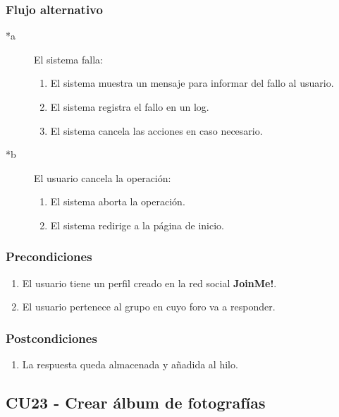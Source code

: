 \documentclass[12pt, a4paper, titlepage]{article}
\begin{document}
\subsubsection{Flujo alternativo}

\begin{description}
	\item [*a] El sistema falla:
	\begin{enumerate}
		\item El sistema muestra un mensaje para informar del fallo al usuario.
		\item El sistema registra el fallo en un log.
		\item El sistema cancela las acciones en caso necesario.
	\end{enumerate}
\end{description}

\begin{description}
	\item [*b] El usuario cancela la operación:
	\begin{enumerate}
		\item El sistema aborta la operación.
		\item El sistema redirige a la página de inicio.
	\end{enumerate}
\end{description}

\subsubsection{Precondiciones}
\begin{enumerate}
	\item El usuario tiene un perfil creado en la red social \textbf{JoinMe!}.
	\item El usuario pertenece al grupo en cuyo foro va a responder.
\end{enumerate}
\subsubsection{Postcondiciones}
\begin{enumerate}
	\item La respuesta queda almacenada y añadida al hilo.
\end{enumerate}


\subsection{CU23 - Crear álbum de fotografías}
\end{document}

